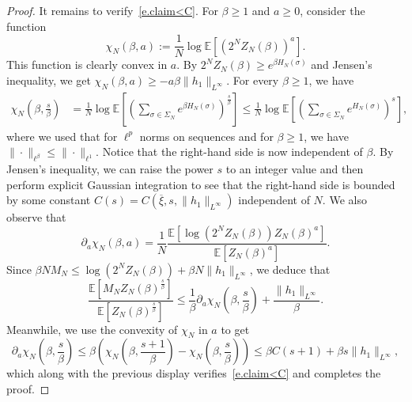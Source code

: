 \documentclass[11pt]{amsart}
\theoremstyle{remark}
\theoremstyle{definition}
\numberwithin{equation}{section}
\numberwithin{proposition}{section}
\numberwithin{figure}{section}
\numberwithin{table}{section}
\newcommand{\E}{\mathbb{E}}
\renewcommand{\le}{\leqslant}
\renewcommand{\ge}{\geqslant}
\renewcommand{\geq}{\geqslant}
\renewcommand{\bar}{\overline}
\newcommand{\Ll}{\left}
\newcommand{\Rr}{\right}
\newcommand{\1}{\mathbf{1}}
\newcommand{\si}{\sigma}
\begin{document}
\begin{proof}
It remains to verify~\eqref{e.claim<C}.
For $\beta\geq 1$ and $a\geq 0$, consider the function
\begin{equation*}  %
\chi_N(\beta, a) := \frac 1 {N} \log \E \Ll[\Ll(2^NZ_N(\beta)\Rr)^a\Rr].
\end{equation*}
This function is clearly convex in $a$. By $2^NZ_N(\beta)\geq e^{\beta H_N(\sigma)}$ and Jensen's inequality, we get $\chi_N(\beta,a)\geq -a\beta\|h_1\|_{L^\infty}$.
For every $\beta\geq1$, we have
\begin{align*}  %
\chi_N\Ll(\beta, \frac s \beta \Rr) 
& = \frac 1 N \log \E \Ll[ \Ll( \sum_{\si \in \Sigma_N} e^{\beta H_N(\sigma)} \Rr)^\frac s \beta  \Rr] 
 \le \frac 1 N \log \E \Ll[ \Ll( \sum_{\si \in \Sigma_N} e^{ H_N(\sigma)} \Rr)^s  \Rr],
\end{align*}
where we used that for $\ell^p$ norms on sequences and for $\beta \ge 1$, we have $\|\cdot\|_{\ell^\beta} \le \|\cdot\|_{\ell^1}$. 
Notice that the right-hand side is now independent of $\beta$.
By Jensen's inequality, we can raise the power $s$ to an integer value and then perform explicit Gaussian integration to see that the right-hand side is bounded by some constant $C(s)=C(\bar\xi,s,\|h_1\|_{L^\infty})$ independent of $N$. We also observe that
\begin{equation*}  %
\partial_a \chi_N(\beta,a) = \frac 1 {N} \frac{\E\Ll[\log \Ll(2^NZ_N(\beta)\Rr) Z_N(\beta)^a \Rr]}{\E[Z_N(\beta)^a ]}.
\end{equation*}
Since $\beta N M_N \le \log \Ll(2^NZ_N(\beta)\Rr)+\beta N\|h_1\|_{L^\infty}$, we deduce that
\begin{equation*}  %
\frac{\E\Ll[M_N Z_N(\beta)^\frac s \beta\Rr]}{\E\Ll[Z_N(\beta)^\frac s \beta\Rr]} \le \frac 1 \beta \partial_a \chi_N\Ll(\beta,\frac s \beta \Rr) +\frac{\|h_1\|_{L^\infty}}{\beta}. 
\end{equation*}
Meanwhile, we use the convexity of $\chi_N$ in $a$ to get
\begin{equation*}  %
\partial_a \chi_N \Ll( \beta, \frac s \beta \Rr) \le \beta \Ll(\chi_N \Ll( \beta, \frac {s+1} \beta \Rr) - \chi_N \Ll( \beta, \frac s \beta \Rr)\Rr) \le \beta C(s+1)+\beta s\|h_1\|_{L^\infty},
\end{equation*}
which along with the previous display verifies~\eqref{e.claim<C} and completes the proof.
\end{proof}
\end{document}
